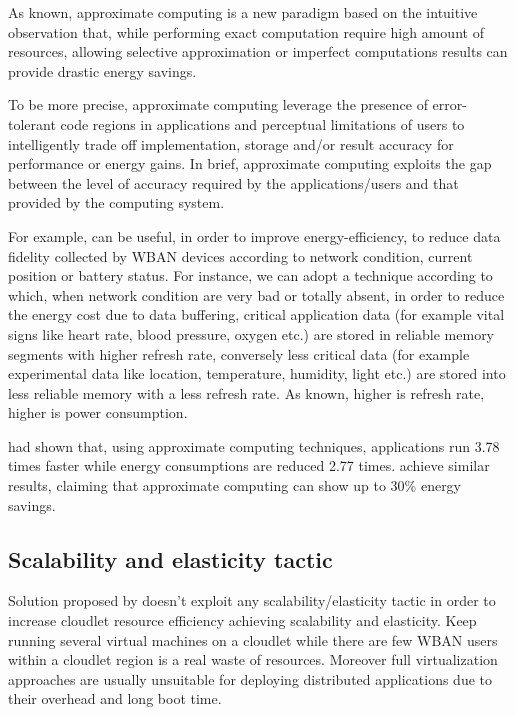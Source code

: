 \documentclass[sigchi]{acmart}
\begin{document}
As known, approximate computing is a new paradigm based on the intuitive observation that, while performing exact computation require high amount of resources, allowing selective approximation or imperfect computations results can provide drastic energy savings.

To be more precise, approximate computing leverage the presence of error-tolerant code regions in applications and perceptual limitations of users to intelligently trade off implementation, storage and/or result accuracy for performance or energy gains. In brief, approximate computing exploits the gap between the level of accuracy required by the applications/users and that provided by the computing system.

For example, can be useful, in order to improve energy-efficiency, to reduce data fidelity collected by WBAN devices according to network condition, current position or battery status. For instance, we can adopt a technique according to which, when network condition are very bad or totally absent, in order to reduce the energy cost due to data buffering, critical application data (for example vital signs like heart rate, blood pressure, oxygen etc.) are stored in reliable memory segments with higher refresh rate, conversely less critical data (for example experimental data like location, temperature, humidity, light etc.) are stored into less reliable memory with a less refresh rate. As known, higher is refresh rate, higher is power consumption.\cite{Towards}

\citet{ApproximateComputingArticle} had shown that, using approximate computing techniques, applications run 3.78 times faster while energy consumptions are reduced 2.77 times. \citet{ImpactApproximation} achieve similar results, claiming that approximate computing can show up to 30\% energy savings.

\subsection{Scalability and elasticity tactic}

Solution proposed by \citet{MSAReport} doesn't exploit any scalability/elasticity tactic in order to increase cloudlet resource efficiency achieving scalability and elasticity. Keep running several virtual machines on a cloudlet while there are few WBAN users within a cloudlet region is a real waste of resources. Moreover full virtualization approaches are usually unsuitable for deploying distributed applications due to their overhead and long boot time.
\end{document}
